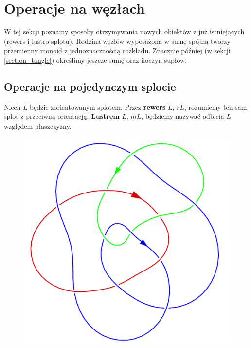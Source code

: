 \section{Operacje na węzłach} %
\label{sec:knot_operations}
W tej sekcji poznamy sposoby otrzymywania nowych obiektów z już istniejących (rewers i lustro splotu).
Rodzina węzłów wyposażona w sumę spójną tworzy przemienny monoid z jednoznacznością rozkładu.
Znacznie później (w sekcji \ref{section_tangle}) określimy jeszcze sumę oraz iloczyn supłów.

\subsection{Operacje na pojedynczym splocie} %
\label{sub:single_operations}
\begin{definition}
    Niech $L$ będzie zorientowanym splotem.
    Przez \textbf{rewers} $L$, $rL$,
    rozumiemy ten sam splot z przeciwną orientacją.
    \textbf{Lustrem} $L$, $mL$,
    będziemy nazywać odbicia $L$ względem płaszczyzny.
    \begin{figure}[H]
        \begin{minipage}[b]{.32\linewidth}
            \centering 
            \includegraphics[width=\linewidth]{../data/link_mirror.png} 
        \end{minipage}

\end{figure}
\end{definition}
